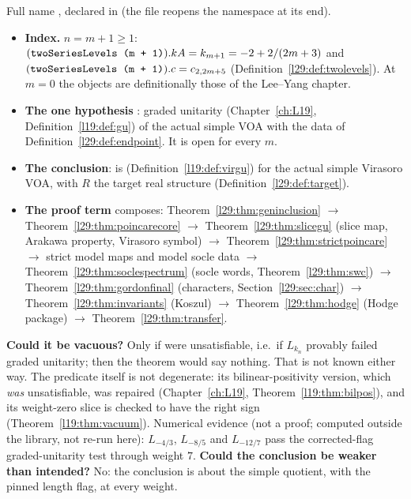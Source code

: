 \begin{dictionary}
Full name , declared in
 (the file reopens the namespace  at its end).
\begin{itemize}
\item \textbf{Index.} $n=m+1\ge1$: $(\lean{twoSeriesLevels (m + 1)}).kA=k_{m+1}=-2+2/(2m+3)$ and
  $(\lean{twoSeriesLevels (m + 1)}).c=c_{2,2m+5}$ (Definition~\ref{l29:def:twolevels}). At $m=0$ the objects are
  definitionally those of the Lee--Yang chapter.
\item \textbf{The one hypothesis} : graded unitarity (Chapter~\ref{ch:L19}, Definition~\ref{l19:def:gu}) of the
  actual simple VOA  with the data of Definition~\ref{l29:def:endpoint}. It is open for every $m$.
\item \textbf{The conclusion}:  is 
  (Definition~\ref{l19:def:virgu}) for the actual simple Virasoro VOA, with $R$ the target real structure
  (Definition~\ref{l29:def:target}).
\item \textbf{The proof term} composes: Theorem~\ref{l29:thm:geninclusion} $\to$ Theorem~\ref{l29:thm:poincarecore}
  $\to$ Theorem~\ref{l29:thm:slicegu} (slice map, Arakawa property, Virasoro symbol) $\to$
  Theorem~\ref{l29:thm:strictpoincare} $\to$ strict model maps and model socle data $\to$
  Theorem~\ref{l29:thm:soclespectrum} (socle words, Theorem~\ref{l29:thm:swc}) $\to$
  Theorem~\ref{l29:thm:gordonfinal} (characters, Section~\ref{l29:sec:char}) $\to$ Theorem~\ref{l29:thm:invariants}
  (Koszul) $\to$ Theorem~\ref{l29:thm:hodge} (Hodge package) $\to$ Theorem~\ref{l29:thm:transfer}.
\end{itemize}
\textbf{Could it be vacuous?} Only if  were unsatisfiable, i.e.\ if $L_{k_n}$ provably failed graded
unitarity; then the theorem would say nothing. That is not known either way. The predicate itself is not degenerate:
its bilinear-positivity version, which \emph{was} unsatisfiable, was repaired (Chapter~\ref{ch:L19},
Theorem~\ref{l19:thm:bilpos}), and its weight-zero slice is checked to have the right sign
(Theorem~\ref{l19:thm:vacuum}). Numerical evidence (not a proof; computed outside the library, not re-run here):
$L_{-4/3}$, $L_{-8/5}$ and $L_{-12/7}$ pass the corrected-flag graded-unitarity test through weight $7$.
\textbf{Could the conclusion be weaker than intended?} No: the conclusion is about the simple quotient, with the pinned
length flag, at every weight.
\end{dictionary}

